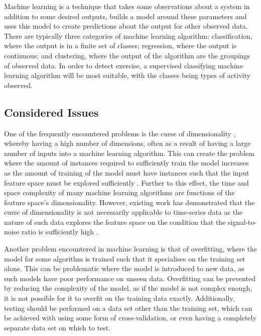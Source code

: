 \label{ml}

Machine learning is a technique that takes some observations about a system in addition to some desired outputs, builds a model around these parameters and uses this model to create predictions about the output for other observed data. There are typically three categories of machine learning algorithm: classification, where the output is in a finite set of classes; regression, where the output is continuous; and clustering, where the output of the algorithm are the groupings of observed data. In order to detect exercise, a supervised classifying machine learning algorithm will be most suitable, with the classes being types of activity observed.

\subsection{Considered Issues}

One of the frequently encountered problems is the curse of dimensionality \cite{bellman1957dynamic}, whereby having a high number of dimensions, often as a result of having a large number of inputs into a machine learning algorithm. This can create the problem where the amount of instances required to sufficiently train the model increases as the amount of training of the model must have instances such that the input feature space must be explored sufficiently \cite{oommen2008objective}. Further to this effect, the time and space complexity of many machine learning algorithms are functions of the feature space's dimensionality. However, existing work has demonstrated that the curse of dimensionality is not necessarily applicable to time-series data as the nature of such data explores the feature space on the condition that the signal-to-noise ratio is sufficiently high \cite{bernecker2011quality}.

Another problem encountered in machine learning is that of overfitting, where the model for some algorithm is trained such that it specialises on the training set alone. This can be problematic where the model is introduced to new data, as such models have poor performance on unseen data. Overfitting can be prevented by reducing the complexity of the model, as if the model is not complex enough, it is not possible for it to overfit on the training data exactly. Additionally, testing should be performed on a data set other than the training set, which can be achieved with using some form of cross-validation, or even having a completely separate data set on which to test.

